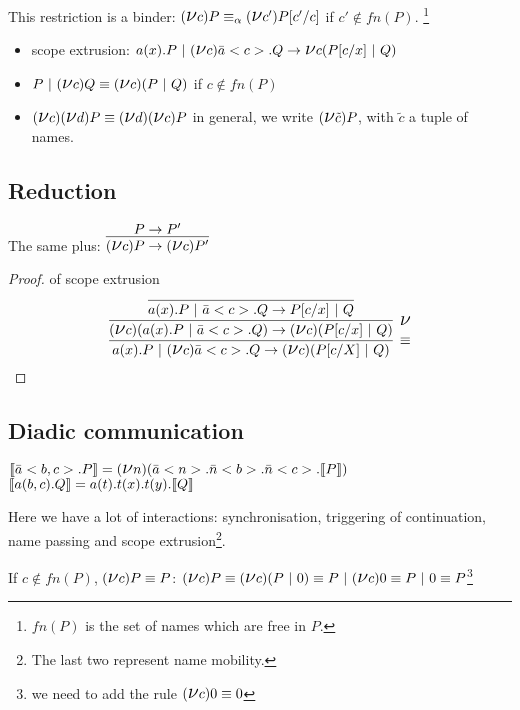 This restriction is a binder: $(\mbox{\Large $\nu $} c) P \equiv_\alpha (\mbox{\Large $\nu $} c') P[c'/c]$ if $c'\not \in fn(P)$. \footnote{$fn(P)$ is the set of names which are free in $P$.}

\begin{prop}
\begin{itemize}
	\item scope extrusion: $a(x).P \ |\  (\mbox{\Large $\nu $} c) \bar a<c>. Q \rightarrow \mbox{\Large $\nu $} c (P[c/x]\ |\  Q)$
	\item $P \ |\  (\mbox{\Large $\nu $} c) Q \equiv (\mbox{\Large $\nu $} c) (P \ |\  Q)$ if $c\not \in fn(P)$
	\item $(\mbox{\Large $\nu $} c)(\mbox{\Large $\nu $} d) P \equiv (\mbox{\Large $\nu $} d)(\mbox{\Large $\nu $} c) P$ in general, we write $(\mbox{\Large $\nu $} \tilde c)P$, with $\tilde c$ a tuple of names.
\end{itemize}
\end{prop}

\subsection{Reduction}
The same plus: $\infer{(\Nu c) P \rightarrow (\Nu c) P'}{P \rightarrow P'}$

\begin{proof}{of scope extrusion}
$$\infer[\equiv]{a(x).P\parc (\Nu c) \bar a<c>.Q \rightarrow (\Nu c)(P[c/X] \parc Q)}
	{
		\infer[\Nu]{(\Nu c)(a(x).P\parc \bar a<c>.Q)\rightarrow (\Nu c)(P[c/x]\parc Q)}	
		{
			\infer{a(x).P\parc \bar a<c>.Q\rightarrow P[c/x]\parc Q}{}
		}
	}
$$

\end{proof}	

\subsection{Diadic communication}

$\llbracket \bar a<b, c>.P\rrbracket = (\mbox{\Large $\nu $} n)(\bar a<n>.\bar n<b>.\bar n<c>.\llbracket P\rrbracket)$
$\llbracket a(b, c).Q\rrbracket = a(t).t(x).t(y).\llbracket Q\rrbracket$


Here we have a lot of interactions: synchronisation, triggering of continuation, name passing and scope extrusion\footnote{The last two represent name mobility.}.

\begin{ex}
	If $c \not \in fn(P)$, $(\mbox{\Large $\nu $} c) P \equiv P$:
$(\mbox{\Large $\nu $} c) P \equiv (\mbox{\Large $\nu $} c)(P\ |\  0) \equiv P\ |\  (\mbox{\Large $\nu $} c) 0 \equiv P\ |\  0\equiv P$\footnote{we need to add the rule $(\mbox{\Large $\nu $} c) 0 \equiv 0$}
\end{ex}

